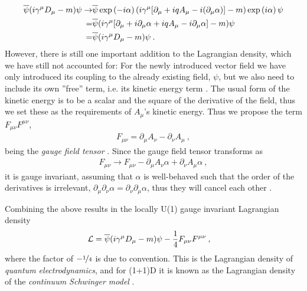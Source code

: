 \documentclass[../main.tex]{subfiles} %
\begin{document}
\begin{align}
\begin{split}
    \psibar (i \gamma^\mu D_\mu - m) \psi \rightarrow
        & \psibar \exp{-i\alpha} (i \gamma^\mu [\partial_\mu + iqA_\mu - i(\partial_\mu\alpha)] - m) \exp{i\alpha} \psi \\
        =& \psibar (i \gamma^\mu [\partial_\mu + i \partial_\mu \alpha + iqA_\mu - i\partial_\mu\alpha] - m) \psi \\
        =& \psibar (i \gamma^\mu D_\mu - m) \psi \: .
\end{split}
\end{align}
However, there is still one important addition to the Lagrangian density, which we have still not accounted for: For the newly introduced vector field we have only introduced its coupling to the already existing field, $\psi$, but we also need to include its own ''free'' term, i.e. its kinetic energy term \cite{griffiths_introToElementaryParticles_2008}. The usual form of the kinetic energy is to be a scalar and the square of the derivative of the field, thus we set these as the requirements of $A_\mu$'s kinetic energy. Thus we propose the term $F_{\mu\nu}F^{\mu\nu}$,
\begin{align}
    F_{\mu\nu} = \partial_\mu A_\nu - \partial_\nu A_\mu \: ,
\end{align}
being the \emph{gauge field tensor} \cite{griffiths_introToEldyn_2017}. Since the gauge field tensor transforms as
\begin{align}
    F_{\mu\nu} \rightarrow F_{\mu\nu} - \partial_\mu A_\nu \alpha + \partial_\nu A_\mu \alpha \: ,
\end{align}
it is gauge invariant, assuming that $\alpha$ is well-behaved such that the order of the derivatives is irrelevant, $\partial_\mu\partial_\nu\alpha = \partial_\nu\partial_\mu\alpha$, thus they will cancel each other \cite{panyella_masterThesis_2019}.

Combining the above results in the locally U(1) gauge invariant Lagrangian density
\begin{align} \label{eq:ContinuumSchwingerModelLagrangianDensity}
    \mathcal{L} &= \overline{\psi} (i \gamma^\mu D_\mu - m) \psi - \frac{1}{4}F_{\mu\nu}F^{\mu\nu} \: ,
\end{align}
where the factor of $-\nicefrac{1}{4}$ is due to convention. This is the Lagrangian density of \emph{quantum electrodynamics}, and for (1+1)D it is known as the Lagrangian density of the \emph{continuum Schwinger model} \cite{melnikov_latticeSchwingerModel_2000}.
\end{document}
